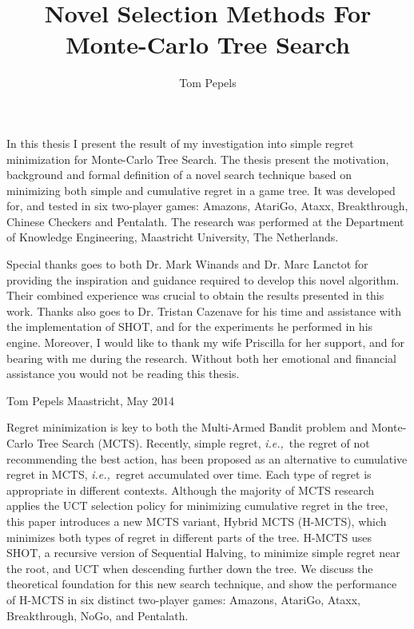 \documentclass{kecsmstr}
\title{Novel Selection Methods For Monte-Carlo Tree Search}
\author{Tom Pepels}
\newcommand{\ie}{{\it i.e.,}~}
\begin{document}
\makeheaders {} \maketitle \setcounter{page}{2}
\emptypage

In this thesis I present the result of my investigation into simple regret minimization for Monte-Carlo Tree Search. The thesis present the motivation, background and formal definition of a novel search technique based on minimizing both simple and cumulative regret in a game tree. It was developed for, and tested in six two-player games: Amazons, AtariGo, Ataxx,  Breakthrough, Chinese Checkers and Pentalath. The research was performed at the Department of Knowledge Engineering, Maastricht University, The Netherlands.

Special thanks goes to both Dr. Mark Winands and Dr. Marc Lanctot for providing the inspiration and guidance required to develop this novel algorithm. Their combined experience was crucial to obtain the results presented in this work. Thanks also goes to Dr. Tristan Cazenave for his time and assistance with the implementation of SHOT, and for the experiments he performed in his engine. Moreover, I would like to thank my wife Priscilla for her support, and for  bearing with me during the research. Without both her emotional and financial assistance you would not be reading this thesis.
\newline \newline

\noindent Tom Pepels \newline
Maastricht, May 2014
\emptypage

 Regret minimization is key to both the Multi-Armed Bandit problem and Monte-Carlo Tree Search (MCTS). Recently, simple regret, \ie the regret of not recommending the best action, has been proposed as an alternative to cumulative regret in MCTS, \ie regret accumulated over time. Each type of regret is appropriate in different contexts. Although the majority of MCTS research applies the UCT selection policy for minimizing cumulative regret in the tree, this paper introduces a new MCTS variant, Hybrid MCTS (H-MCTS), which minimizes both types of regret in different parts of the tree. H-MCTS uses SHOT, a recursive version of Sequential Halving, to minimize simple regret near the root, and UCT when descending further down the tree. We discuss the theoretical foundation for this new search technique, and show the performance of H-MCTS in six distinct two-player games: Amazons, AtariGo, Ataxx, Breakthrough, NoGo, and Pentalath. \emptypage
\end{document}
